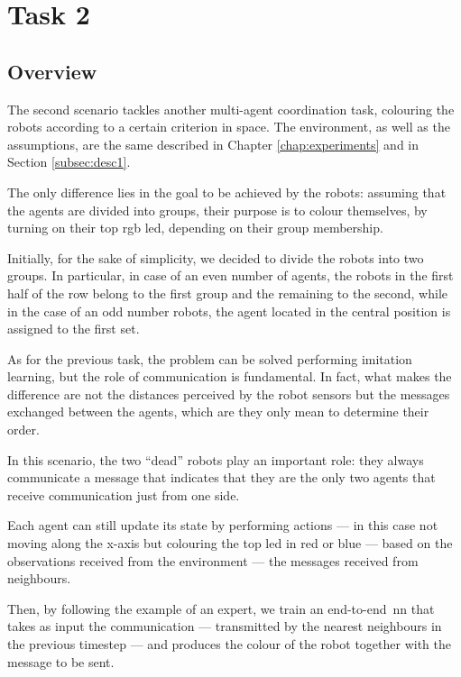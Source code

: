 \section{Task 2}
\label{sec:task2}

\subsection{Overview}
\label{subsec:desc2}

The second scenario tackles another multi-agent coordination task, colouring the 
robots according to a certain criterion in space. 
The environment, as well as the assumptions, are the same described in Chapter 
\ref{chap:experiments} and in Section \ref{subsec:desc1}.

The only difference lies in the goal to be achieved by the robots: assuming that 
the agents are divided into groups, their purpose is to colour themselves, by 
turning on their top \gls{rgb} \gls{led}, depending on their group membership.

Initially, for the sake of simplicity, we decided to divide the robots into two 
groups. In particular, in case of an even number of agents, the robots in the first 
half of the row belong to the first group and the remaining to the second, while in 
the case of an odd number robots, the agent located in the central position is 
assigned to the first set.

As for the previous task, the problem can be solved performing imitation 
learning, but the role of communication is fundamental. In fact, what makes the 
difference are not the distances perceived by the robot sensors but the messages 
exchanged between the agents, which are they only mean to determine their 
order. 

In this scenario, the two ``dead'' robots play an important role: they always 
communicate a message that indicates that they are the only two agents that 
receive communication just from one side.

Each agent can still update its state by performing actions — in this case not 
moving along the x-axis but colouring the top \gls{led} in red or blue — based on 
the observations received from the environment — the messages received from 
neighbours. 

Then, by following the example of an expert, we train an end-to-end \gls{nn} 
that takes as input the communication — transmitted by the nearest neighbours in 
the previous timestep — and produces the colour of the robot together with the 
message to be sent.

